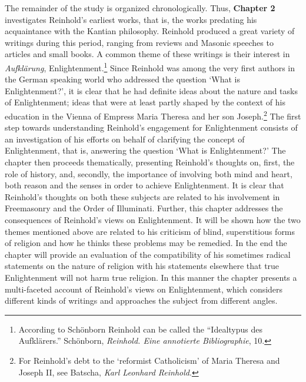 The remainder of the study is organized chronologically. Thus, \textbf{Chapter 2} investigates Reinhold's earliest works, that is, the works predating his acquaintance with the Kantian philosophy. Reinhold produced a great variety of writings during this period, ranging from reviews and Masonic speeches to articles and small books. A common theme of these writings is their interest in \textit{Aufkl\"{a}rung}, Enlightenment.\footnote{ According to Sch\"{o}nborn Reinhold can be called the ``Idealtypus des Aufkl\"{a}rers.'' Sch\"{o}nborn,\textit{ Reinhold. Eine annotierte Bibliographie}, 10. } Since Reinhold was among the very first authors in the German speaking world who addressed the question `What is Enlightenment?', it is clear that he had definite ideas about the nature and tasks of Enlightenment; ideas that were at least partly shaped by the context of his education in the Vienna of Empress Maria Theresa and her son Joseph.\footnote{ For Reinhold's debt to the `reformist Catholicism' of Maria Theresa and Joseph II, see Batscha, \textit{Karl Leonhard Reinhold}.} The first step towards understanding Reinhold's engagement for Enlightenment consists of an investigation of his efforts on behalf of clarifying the concept of Enlightenment, that is, answering the question `What is Enlightenment?' The chapter then proceeds thematically, presenting Reinhold's thoughts on, first, the role of history, and, secondly, the importance of involving both mind and heart, both reason and the senses in order to achieve Enlightenment. It is clear that Reinhold's thoughts on both these subjects are related to his involvement in Freemasonry and the Order of Illuminati. Further, this chapter addresses the consequences of Reinhold's views on Enlightenment. It will be shown how the two themes mentioned above are related to his criticism of blind, superstitious forms of religion and how he thinks these problems may be remedied. In the end the chapter will provide an evaluation of the compatibility of his sometimes radical statements on the nature of religion with his statements elsewhere that true Enlightenment will not harm true religion. In this manner the chapter presents a multi{-}faceted account of Reinhold's views on Enlightenment, which considers different kinds of writings and approaches the subject from different angles. 

